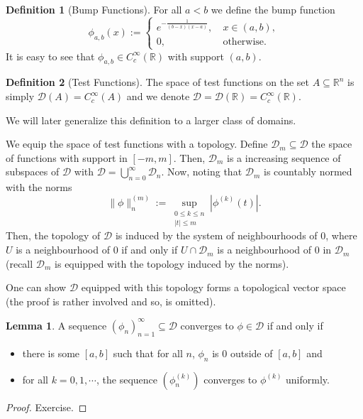 \documentclass[]{article}
\theoremstyle{definition}
\theoremstyle{definition}
\newtheorem{definition}{Definition}[section]
\newtheorem{lemma}{Lemma}[section]
\begin{document}
\begin{definition}[Bump Functions]
  For all \(a < b\) we define the bump function 
  \[\phi_{a, b}(x) := \begin{cases}
    e^{-\frac{1}{(b - x)(x - a)}},\ & x \in (a, b),\\
    0,\ & \text{otherwise}.
  \end{cases}\]
  It is easy to see that \(\phi_{a, b} \in C_c^\infty(\mathbb{R})\) with 
  support \((a, b)\). 
\end{definition}

\begin{definition}[Test Functions]
  The space of test functions on the set \(A \subseteq \mathbb{R}^n\) is simply 
  \(\mathcal{D}(A) = C_c^\infty(A)\) and we denote 
  \(\mathcal{D} = \mathcal{D}(\mathbb{R}) = C_c^\infty(\mathbb{R})\).

  We will later generalize this definition to a larger class of domains. 
\end{definition}

We equip the space of test functions with a topology. Define 
\(\mathcal{D}_m \subseteq \mathcal{D}\) the space of functions with 
support in \([-m, m]\). Then, \(\mathcal{D}_m\) is a increasing sequence of 
subspaces of \(\mathcal{D}\) with \(\mathcal{D} = \bigcup_{n = 0}^\infty \mathcal{D}_n\).
Now, noting that \(\mathcal{D}_m\) is countably normed with the norms 
\[\|\phi\|_n^{(m)} := \sup_{\substack{0 \le k \le n\\ |t| \le m}} |\phi^{(k)}(t)|.\]
Then, the topology of \(\mathcal{D}\) is induced by the system of neighbourhoods 
of 0, where \(U\) is a neighbourhood of 0 if and only if \(U \cap \mathcal{D}_m\) 
is a neighbourhood of 0 in \(\mathcal{D}_m\) (recall \(\mathcal{D}_m\) is equipped 
with the topology induced by the norms). 

One can show \(\mathcal{D}\) equipped with this topology forms a topological 
vector space (the proof is rather involved and so, is omitted).

\begin{lemma}
  A sequence \((\phi_n)_{n = 1}^\infty \subseteq \mathcal{D}\) converges to 
  \(\phi \in \mathcal{D}\) if and only if 
  \begin{itemize}
    \item there is some \([a, b]\) such that for all \(n\), \(\phi_n\) is 0 
      outside of \([a, b]\) and 
    \item for all \(k = 0, 1, \cdots\), the sequence \((\phi_n^{(k)})\) 
      converges to \(\phi^{(k)}\) uniformly.
  \end{itemize} 
\end{lemma}
\begin{proof}
  Exercise.
\end{proof}
\end{document}
